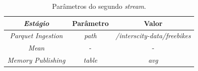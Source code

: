 \begin{table}[]
\centering
    \caption{Parâmetros do segundo \textit{stream}.}
\label{tab:case2-2}
\begin{tabular}{|c|c|c|}
\hline
\textit{\textbf{Estágio}}    & \textbf{Parâmetro} & \textbf{Valor}                      \\ \hline
\textit{Parquet Ingestion} & \textit{path}      & \textit{/interscity-data/freebikes} \\ \hline
\textit{Mean}              & -                  & -                                   \\ \hline
\textit{Memory Publishing} & \textit{table}     & \textit{avg}                        \\ \hline
\end{tabular}
\end{table}

